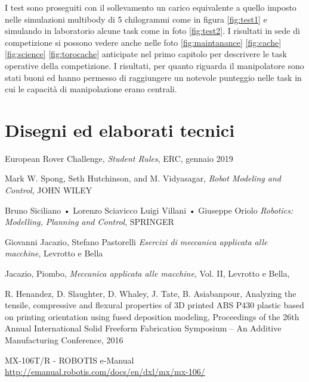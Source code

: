 \documentclass[%
corpo=11pt,
twoside,
 stile=classica,
oldstyle,
greek,%
]{toptesi}
\begin{document}
 	I test sono proseguiti con il sollevamento un carico equivalente a quello imposto nelle simulazioni multibody di 5 chilogrammi come in figura \ref{fig:test1} e simulando in laboratorio alcune task come in foto \ref{fig:test2}. 
 	I risultati in sede di competizione si possono vedere anche nelle foto \ref{fig:maintanance} \ref{fig:cache} \ref{fig:science} \ref{fig:torocache} anticipate nel primo capitolo per descrivere le task operative della competizione. I risultati, per quanto riguarda il manipolatore sono stati buoni ed hanno permesso di raggiungere un notevole punteggio nelle task in cui le capacità di manipolazione erano centrali. 
 		


\backmatter
\chapter{Disegni ed elaborati tecnici}









\begin{thebibliography}{9}
 European Rover Challenge, \emph{Student Rules}, ERC, gennaio 2019

Mark W. Spong, Seth Hutchinson, and M. Vidyasagar, \emph{Robot Modeling and Control}, JOHN WILEY  

Bruno Siciliano • Lorenzo Sciavicco Luigi Villani • Giuseppe Oriolo \emph{Robotics: Modelling, Planning and Control}, SPRINGER

Giovanni Jacazio, Stefano Pastorelli \emph{Esercizi di meccanica applicata alle macchine}, Levrotto e Bella

Jacazio, Piombo, \emph{Meccanica applicata alle macchine}, Vol. II, Levrotto e Bella,

 R. Henandez, D. Slaughter, D. Whaley, J. Tate, B. Asiabanpour, Analyzing the tensile, compressive and flexural properties of 3D printed ABS P430 plastic based on printing orientation using fused deposition modeling, Proceedings of the 26th Annual International Solid Freeform Fabrication Symposium – An Additive Manufacturing Conference, 2016

 MX-106T/R - ROBOTIS e-Manual \url{http://emanual.robotis.com/docs/en/dxl/mx/mx-106/}
\end{thebibliography}
\end{document}
